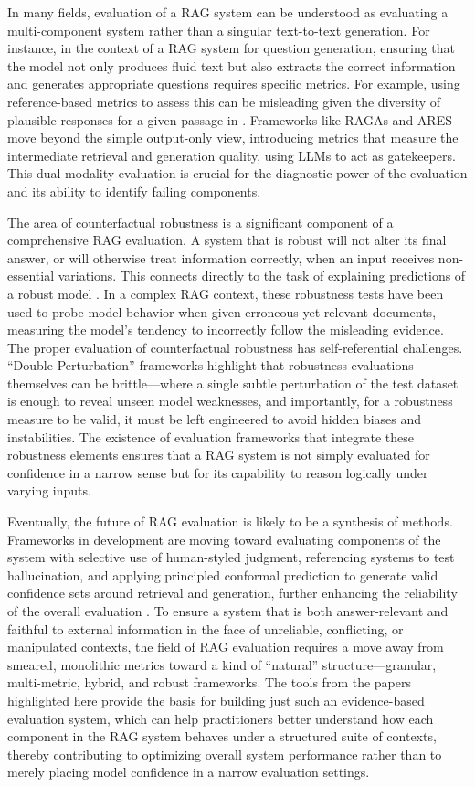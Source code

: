 \documentclass[11pt]{article}
\begin{document}
In many fields, evaluation of a RAG system can be understood as evaluating a multi-component system rather than a singular text-to-text generation. For instance, in the context of a RAG system for question generation, ensuring that the model not only produces fluid text but also extracts the correct information and generates appropriate questions requires specific metrics. For example, using reference-based metrics to assess this can be misleading given the diversity of plausible responses for a given passage in \cite{ref403}. Frameworks like RAGAs and ARES move beyond the simple output-only view, introducing metrics that measure the intermediate retrieval and generation quality, using LLMs to act as gatekeepers. This dual-modality evaluation is crucial for the diagnostic power of the evaluation and its ability to identify failing components.

The area of counterfactual robustness is a significant component of a comprehensive RAG evaluation. A system that is robust will not alter its final answer, or will otherwise treat information correctly, when an input receives non-essential variations. This connects directly to the task of explaining predictions of a robust model \cite{ref410}. In a complex RAG context, these robustness tests have been used to probe model behavior when given erroneous yet relevant documents, measuring the model's tendency to incorrectly follow the misleading evidence. The proper evaluation of counterfactual robustness has self-referential challenges. ``Double Perturbation'' frameworks \cite{ref415} highlight that robustness evaluations themselves can be brittle---where a single subtle perturbation of the test dataset is enough to reveal unseen model weaknesses, and importantly, for a robustness measure to be valid, it must be left engineered to avoid hidden biases and instabilities. The existence of evaluation frameworks that integrate these robustness elements ensures that a RAG system is not simply evaluated for confidence in a narrow sense but for its capability to reason logically under varying inputs.

Eventually, the future of RAG evaluation is likely to be a synthesis of methods. Frameworks in development are moving toward evaluating components of the system with selective use of human-styled judgment, referencing systems to test hallucination, and applying principled conformal prediction to generate valid confidence sets around retrieval and generation, further enhancing the reliability of the overall evaluation \cite{ref184}. To ensure a system that is both answer-relevant and faithful to external information in the face of unreliable, conflicting, or manipulated contexts, the field of RAG evaluation requires a move away from smeared, monolithic metrics toward a kind of ``natural'' structure---granular, multi-metric, hybrid, and robust frameworks. The tools from the papers highlighted here provide the basis for building just such an evidence-based evaluation system, which can help practitioners better understand how each component in the RAG system behaves under a structured suite of contexts, thereby contributing to optimizing overall system performance rather than to merely placing model confidence in a narrow evaluation settings.
\end{document}
